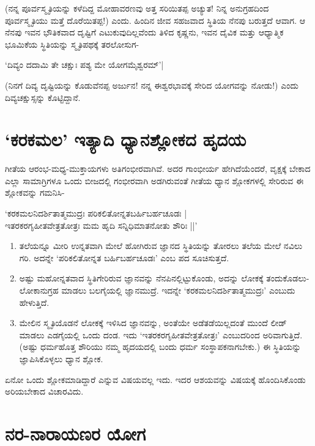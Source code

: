 (ನನ್ನ ಪೂರ್ವಸ್ಮೃತಿಯನ್ನು ಕಳೆದಿದ್ದ ಮೋಹಾವರಣವು ಅತ್ತ ಸರಿಯಿತಪ್ಪ ಅಚ್ಯುತ! ನಿನ್ನ ಅನುಗ್ರಹದಿಂದ ಪೂರ್ವಸ್ಮೃತಿಯು ಮತ್ತೆ ದೊರೆಯಿತಪ್ಪ!) ಎಂದು. ಹಿಂದಿನ ಜೀವ ಸಹಜವಾದ ಸ್ಥಿತಿಯ ನೆನಪು ಬರುತ್ತದೆ ಆವಾಗ. ಆ ನೆನಪು ಇವನ ಭೌತಿಕವಾದ ದೃಷ್ಟಿಗೆ ಎಟುಕುವುದಿಲ್ಲವೆಂದು ತಿಳಿದ ಕೃಷ್ಣನು, ಇವನ ದೈವಿಕ ಮತ್ತು ಆಧ್ಯಾತ್ಮಿಕ ಭೂಮಿಕೆಯ ಸ್ಥಿತಿಯನ್ನು ಸ್ಮೃತಿಪಥಕ್ಕೆ ತರಲೋಸುಗ-

\begin{shloka}
`ದಿವ್ಯಂ ದದಾಮಿ ತೇ ಚಕ್ಷುಃ ಪಶ್ಯ ಮೇ ಯೋಗಮೈಶ್ವರಮ್'|\label{91}
\end{shloka}

(ನಿನಗೆ ದಿವ್ಯ ದೃಷ್ಟಿಯನ್ನು ಕೊಡುವೆನಪ್ಪ ಅರ್ಜುನ! ನನ್ನ ಈಶ್ವರಭಾವಕ್ಕೆ ಸೇರಿದ ಯೋಗವನ್ನು ನೋಡು!) ಎಂದು ದಿವ್ಯಚಕ್ಷುಸ್ಸನ್ನು ಕೊಟ್ಟಿದ್ದಾನೆ.

\section*{`ಕರಕಮಲ' ಇತ್ಯಾದಿ ಧ್ಯಾನಶ್ಲೋಕದ ಹೃದಯ}

ಗೀತೆಯ ಆರಂಭ-ಮಧ್ಯ-ಮುಕ್ತಾಯಗಳು ಅತಿಗಂಭೀರವಾಗಿವೆ. ಅದರ ಗಾಂಭೀರ್ಯ ಹೇಗಿದೆಯೆಂದರೆ, ವೃಕ್ಷಕ್ಕೆ ಬೇಕಾದ ಎಲ್ಲಾ ಸಾಮಾಗ್ರಿಗಳೂ ಒಂದು ಬೀಜದಲ್ಲಿ ಗಂಭೀರವಾಗಿ ಅಡಗಿರುವಂತೆ ಗೀತೆಯ ಧ್ಯಾನ ಶ್ಲೋಕಗಳಲ್ಲಿ ಸೇರಿರುವ ಈ ಶ್ಲೋಕವನ್ನು ಗಮನಿಸಿ-

\begin{shloka}
`ಕರಕಮಲನಿದರ್ಶಿತಾತ್ಮಮುದ್ರಃ ಪರಿಕಲಿತೋನ್ನತಬರ್ಹಿಬರ್ಹಚೂಡಃ |\label{92}\\
ಇತರಕರಗೃಹೀತವೇತ್ರತೋತ್ರಃ ಮಮ ಹೃದಿ ಸನ್ನಿಧಿಮಾತನೋತು ಶೌರಿಃ ||'
\end{shloka}

\begin{enumerate}
\item ತಲೆಯನ್ನೂ ಮೀರಿ ಉನ್ನತವಾಗಿ ಮೇಲೆ ಹೋಗಿರುವ ಜ್ಞಾನದ ಸ್ಥಿತಿಯನ್ನು ತೋರಲು ತಲೆಯ ಮೇಲೆ ನವಿಲು ಗರಿ. ಅದನ್ನೇ `ಪರಿಕಲಿತೋನ್ನತ ಬರ್ಹಿಬರ್ಹಚೂಡಃ' ಎಂಬ ಪದ ಸೂಚಿಸುತ್ತದೆ.
\item ಅಷ್ಟು ಮಹೋನ್ನತವಾದ ಸ್ಥಿತಿಗೇರಿರುವ ಜ್ಞಾನವನ್ನು ನೆನಪಿನಲ್ಲಿಟ್ಟುಕೊಂಡು, ಅದನ್ನು ಲೋಕಕ್ಕೆ ತಂದುಕೊಡಲು-ಲೋಕಾನುಗ್ರಹ ಮಾಡಲು ಬಲಗೈಯಲ್ಲಿ ಜ್ಞಾನಮುದ್ರೆ. ಇದನ್ನೇ `ಕರಕಮಲನಿದರ್ಶಿತಾತ್ಮಮುದ್ರಃ' ಎಂಬುದು ಹೇಳುತ್ತಿದೆ.
\item ಮೇಲಿನ ಸ್ಮೃತಿಯೊಡನೆ ಲೋಕಕ್ಕೆ ಇಳಿಸಿದ ಜ್ಞಾನವನ್ನು, ಅಂತೆಯೇ ಅಡೆತಡೆಯಿಲ್ಲದಂತೆ ಮುಂದೆ ಲೀಡ್ ಮಾಡಲು ಎಡಗೈಯಲ್ಲಿ ಒಂದು ದಂಡ. ಇದು `ಇತರಕರಗೃಹೀತವೇತ್ರತೋತ್ರಃ' ಎಂಬುದರಿಂದ ಅರಿವಾಗುತ್ತಿದೆ. (ಅಷ್ಟು ಧರ್ಮಹೊತ್ತ ಶೌರಿಯು ನಮ್ಮ ಹೃದಯದಲ್ಲಿ ಬಂದು ಧರ್ಮ ಸಂಸ್ಥಾಪಕನಾಗಬೇಕು.) ಈ ಸ್ಥಿತಿಯನ್ನು ಜ್ಞಾಪಿಸಿಕೊಳ್ಳಲು ಧ್ಯಾನ ಶ್ಲೋಕ.
\end{enumerate}

ಏನೋ ಒಂದು ಶ್ಲೋಕಮಾಡಿದ್ದಾರೆ ಎನ್ನುವ ವಿಷಯವಲ್ಲ ಇದು. ಇದರ ಆಶಯವನ್ನು ವಿಷಯಕ್ಕೆ ಹೊಂದಿಸಿಕೊಂಡು ಅರಿಯಬೇಕಾದ ವಿಚಾರವಿದು.

\section*{ನರ-ನಾರಾಯಣರ ಯೋಗ}
 
